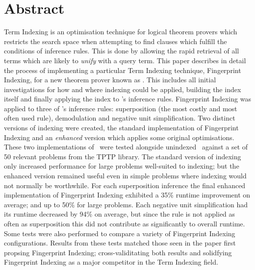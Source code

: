 
\chapter*{Abstract}
\label{cha:abstract}

Term Indexing is an optimisation technique for logical theorem provers which
restricts the search space when attempting to find clauses which fulfill the conditions
of inference rules. This is done by allowing the rapid retrieval of all terms which
are likely to \emph{unify} with a query term. This paper describes in detail
the process of implementing a particular Term Indexing technique, Fingerprint
Indexing, for a new theorem prover known as \beagle. This includes all initial investigations
for how and where indexing could be applied, building the index itself and finally applying the
index to \beagle's inference rules.
Fingerprint Indexing was applied to three of \beagle's inference rules: superposition (the most costly and most often used rule),
demodulation and negative unit simplification. Two distinct versions of indexing were
created, the standard implementation of Fingerprint Indexing and an \emph{enhanced}
version which applies some original optimisations.
These two implementations of \beagle\ were tested alongside unindexed \beagle\ 
against a set of 50 relevant problems from the TPTP library. The standard version
of indexing only increased performance for large problems well-suited to indexing;
but the enhanced version remained useful even in simple problems where indexing would
not normally be worthwhile.
For each superposition inference the final enhanced implementation of Fingerprint Indexing exhibited a
35\% runtime improvement on average; and up to 50\% for large problems.
Each negative unit simplification had its runtime decreased by 94\% on average,
but since the rule is not applied as often as superposition this did not contribute as
significantly to overall runtime. Some tests were also performed to compare
a variety of Fingerprint Indexing configurations. Results from these tests
matched those seen in the paper first propsing Fingerprint Indexing; cross-validitating
both results and solidfying Fingerprint Indexing as a major competitor
in the Term Indexing field.


